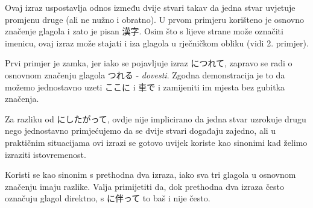 	Ovaj izraz uspostavlja odnos između dvije stvari takav da jedna stvar uvjetuje promjenu druge (ali ne nužno i obratno). U prvom primjeru korišteno je osnovno značenje glagola i zato je pisan 漢字. Osim što s lijeve strane može označiti imenicu, ovaj izraz može stajati i iza glagola u rječničkom obliku (vidi 2. primjer).
	
	\begin{reibun}
	\end{reibun}
	\newpage
	Prvi primjer je zamka, jer iako se pojavljuje izraz につれて, zapravo se radi o osnovnom značenju glagola つれる - \textit{dovesti}. Zgodna demonstracija je to da možemo jednostavno uzeti ここに i 車で i zamijeniti im mjesta bez gubitka značenja.
	
	Za razliku od にしたがって, ovdje nije implicirano da jedna stvar uzrokuje drugu nego jednostavno primjećujemo da se dvije stvari događaju zajedno, ali u praktičnim situacijama ovi izrazi se gotovo uvijek koriste kao sinonimi kad želimo izraziti istovremenost.
	
	\begin{reibun}
	\end{reibun}

	Koristi se kao sinonim s prethodna dva izraza, iako sva tri glagola u osnovnom značenju imaju razlike. Valja primijetiti da, dok prethodna dva izraza često označuju glagol direktno, s に伴って to baš i nije često.
	
